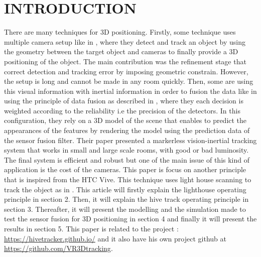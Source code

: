 \documentclass{vldb}
\begin{document}
\section{INTRODUCTION}
There are many techniques for 3D positioning. Firstly, some technique uses multiple camera setup like in \cite{lee2013real}, where they detect and track an object by using the geometry between the target object and cameras to finally provide a 3D positioning of the object. The main contribution was the refinement stage that correct detection and tracking error by imposing geometric constrain. However, the setup is long and cannot be made in any room quickly. \newline
Then, some are using this visual information with inertial information in order to fusion the data like in \cite{bleser2009advanced} using the principle of data fusion as described in \cite{chair1986optimal}, where they each decision is weighted according to the reliability i.e the precision of the detectors. In this configuration, they rely on a 3D model of the scene that enables to predict the appearances of the features by rendering the model using the prediction data of the
sensor fusion filter. Their paper presented a markerless vision-inertial tracking system that works in small and large scale rooms, with good or bad luminosity. The final system is efficient and robust but one of the main issue of this kind of application is the cost of the cameras.\newline
This paper is focus on another principle that is inspired from the HTC Vive. This technique uses light house scanning to track the object as in \cite{kreylos2016lighthouse}. This article will firstly explain the lighthouse operating principle in section 2. Then, it will explain the hive track operating principle in section 3. Thereafter, it will present the modelling and the simulation made to test the sensor fusion for 3D positioning in section 4 and finally it will present the results in section 5. This paper is related to the project : \url{https://hivetracker.github.io/} and it also have his own project github at \newline \url{https://github.com/VR3Dtracking}.
\end{document}
